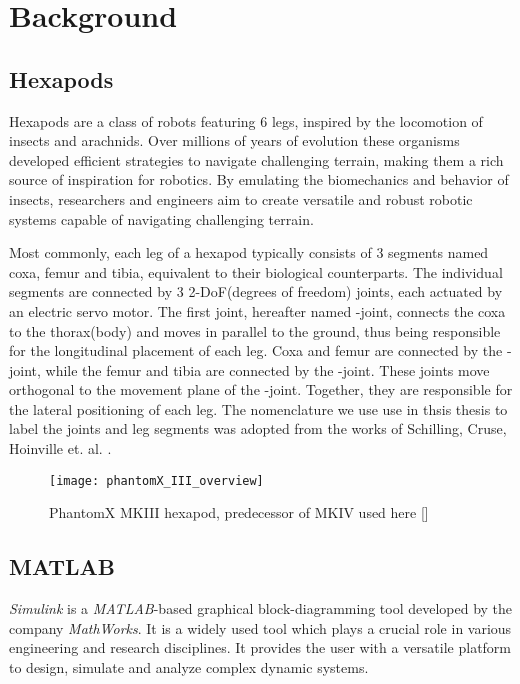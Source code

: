 \chapter{Background}
\label{ch:background}

\section{Hexapods}
Hexapods are a class of robots featuring 6 legs, inspired by the locomotion of insects and arachnids.
Over millions of years of evolution these organisms developed efficient strategies to navigate challenging terrain, making them a rich source of inspiration for robotics.
By emulating the biomechanics and behavior of insects, researchers and engineers aim to create versatile and robust robotic systems capable of navigating challenging terrain.

Most commonly, each leg of a hexapod typically consists of 3 segments named coxa, femur and tibia, equivalent to their biological counterparts.
The individual segments are connected by 3 2-DoF(degrees of freedom) joints, each actuated by an electric servo motor.
The first joint, hereafter named \textalpha-joint, connects the coxa to the thorax(body) and moves in parallel to the ground, thus being responsible for the longitudinal placement of each leg.
Coxa and femur are connected by the \textbeta-joint, while the femur and tibia are connected by the \textgamma-joint. 
These joints move orthogonal to the movement plane of the \textalpha-joint. Together, they are responsible for the lateral positioning of each leg.
The nomenclature we use use in thsis thesis to label the joints and leg segments was adopted from the works of Schilling, Cruse, Hoinville et. al. \parencite{schilling2013walknet, HeterarchicalArchitectureSchilling}.

\begin{figure}[h]
	\centerline{\texttt{[image: phantomX\_III\_overview]}}
	\caption{PhantomX MKIII hexapod, predecessor of MKIV used here [\cite{PhantomX_MKIII}]}
	\label{figure: PhantomX MKIII}
\end{figure}




\section{MATLAB}
\textit{Simulink\textsuperscript{\textregistered}} is a \textit{MATLAB\textsuperscript{\textregistered}}-based graphical block-diagramming tool developed by the company \textit{MathWorks\textsuperscript{\textregistered}}. 
It is a widely used tool which plays a crucial role in various engineering and research disciplines.
It provides the user with a versatile platform to design, simulate and analyze complex dynamic systems.

